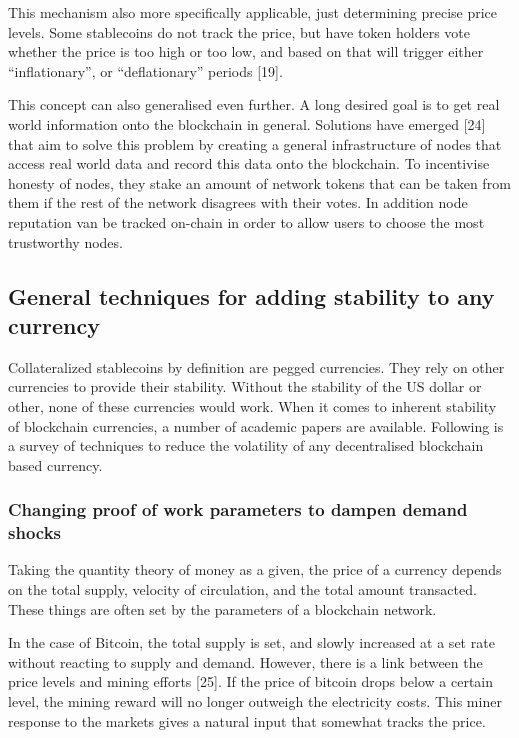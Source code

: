 \documentclass[english,]{IEEEtran}
\begin{document}
This mechanism also more specifically applicable, just determining
precise price levels. Some stablecoins do not track the price, but have
token holders vote whether the price is too high or too low, and based
on that will trigger either ``inflationary'', or ``deflationary''
periods {[}19{]}.

This concept can also generalised even further. A long desired goal is
to get real world information onto the blockchain in general. Solutions
have emerged {[}24{]} that aim to solve this problem by creating a
general infrastructure of nodes that access real world data and record
this data onto the blockchain. To incentivise honesty of nodes, they
stake an amount of network tokens that can be taken from them if the
rest of the network disagrees with their votes. In addition node
reputation van be tracked on-chain in order to allow users to choose the
most trustworthy nodes.

\subsection{General techniques for adding stability to any
currency}\label{general-techniques-for-adding-stability-to-any-currency}

Collateralized stablecoins by definition are pegged currencies. They
rely on other currencies to provide their stability. Without the
stability of the US dollar or other, none of these currencies would
work. When it comes to inherent stability of blockchain currencies, a
number of academic papers are available. Following is a survey of
techniques to reduce the volatility of any decentralised blockchain
based currency.

\subsubsection{Changing proof of work parameters to dampen demand
shocks}\label{changing-proof-of-work-parameters-to-dampen-demand-shocks}

Taking the quantity theory of money as a given, the price of a currency
depends on the total supply, velocity of circulation, and the total
amount transacted. These things are often set by the parameters of a
blockchain network.

In the case of Bitcoin, the total supply is set, and slowly increased at
a set rate without reacting to supply and demand. However, there is a
link between the price levels and mining efforts {[}25{]}. If the price
of bitcoin drops below a certain level, the mining reward will no longer
outweigh the electricity costs. This miner response to the markets gives
a natural input that somewhat tracks the price.
\end{document}
